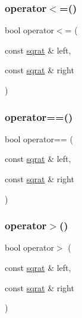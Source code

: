 \mbox{\label{adat-devel_2lib_2SU3_2sqrat_8cc_afeba3149c7e69a9a7feb8bf0c4021761}} 
\subsubsection{\texorpdfstring{operator$<$=()}{operator<=()}}
{\footnotesize\ttfamily bool operator$<$= (\begin{DoxyParamCaption}\item[{const \mbox{\hyperlink{classsqrat}{sqrat}} \&}]{left,  }\item[{const \mbox{\hyperlink{classsqrat}{sqrat}} \&}]{right }\end{DoxyParamCaption})}

\mbox{\label{adat-devel_2lib_2SU3_2sqrat_8cc_a4bacc3bfcb2f8d1841db3f2244581a08}} 
\subsubsection{\texorpdfstring{operator==()}{operator==()}}
{\footnotesize\ttfamily bool operator== (\begin{DoxyParamCaption}\item[{const \mbox{\hyperlink{classsqrat}{sqrat}} \&}]{left,  }\item[{const \mbox{\hyperlink{classsqrat}{sqrat}} \&}]{right }\end{DoxyParamCaption})}

\mbox{\label{adat-devel_2lib_2SU3_2sqrat_8cc_a9b45dd298a66c3afc8c1d7bd34225771}} 
\subsubsection{\texorpdfstring{operator$>$()}{operator>()}}
{\footnotesize\ttfamily bool operator$>$ (\begin{DoxyParamCaption}\item[{const \mbox{\hyperlink{classsqrat}{sqrat}} \&}]{left,  }\item[{const \mbox{\hyperlink{classsqrat}{sqrat}} \&}]{right }\end{DoxyParamCaption})}

